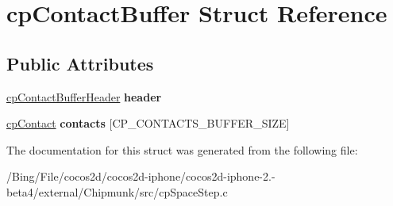 \hypertarget{structcp_contact_buffer}{\section{cp\-Contact\-Buffer Struct Reference}
\label{structcp_contact_buffer}
}
\subsection*{Public Attributes}
\begin{DoxyCompactItemize}
\item 
\hypertarget{structcp_contact_buffer_ad439a4106c8a1bd618cd20074feda7a9}{\hyperlink{structcp_contact_buffer_header}{cp\-Contact\-Buffer\-Header} {\bfseries header}}\label{structcp_contact_buffer_ad439a4106c8a1bd618cd20074feda7a9}

\item 
\hypertarget{structcp_contact_buffer_a769b985e7d69f8b5bfd54255df535421}{\hyperlink{structcp_contact}{cp\-Contact} {\bfseries contacts} \mbox{[}C\-P\-\_\-\-C\-O\-N\-T\-A\-C\-T\-S\-\_\-\-B\-U\-F\-F\-E\-R\-\_\-\-S\-I\-Z\-E\mbox{]}}\label{structcp_contact_buffer_a769b985e7d69f8b5bfd54255df535421}

\end{DoxyCompactItemize}


The documentation for this struct was generated from the following file\-:\begin{DoxyCompactItemize}
\item 
/\-Bing/\-File/cocos2d/cocos2d-\/iphone/cocos2d-\/iphone-\/2.-\/beta4/external/\-Chipmunk/src/cp\-Space\-Step.\-c\end{DoxyCompactItemize}
